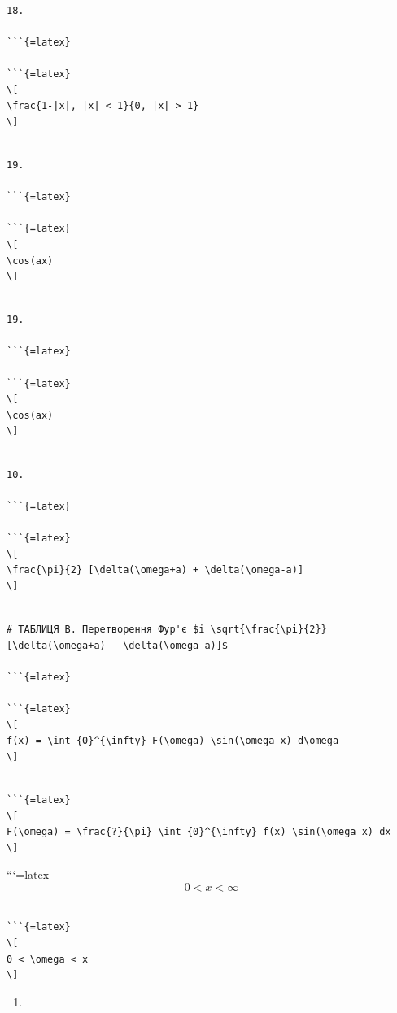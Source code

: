 \documentclass[
]{article}
\providecommand{\tightlist}{%
  \setlength{\itemsep}{0pt}\setlength{\parskip}{0pt}}
\begin{document}
\begin{verbatim}

18.

```{=latex}

```{=latex}
\[
\frac{1-|x|, |x| < 1}{0, |x| > 1}
\]
\end{verbatim}

\begin{verbatim}

19.

```{=latex}

```{=latex}
\[
\cos(ax)
\]
\end{verbatim}

\begin{verbatim}

19.

```{=latex}

```{=latex}
\[
\cos(ax)
\]
\end{verbatim}

\begin{verbatim}

10.

```{=latex}

```{=latex}
\[
\frac{\pi}{2} [\delta(\omega+a) + \delta(\omega-a)]
\]
\end{verbatim}

\begin{verbatim}

# ТАБЛИЦЯ B. Перетворення Фур'є $i \sqrt{\frac{\pi}{2}} [\delta(\omega+a) - \delta(\omega-a)]$ 

```{=latex}

```{=latex}
\[
f(x) = \int_{0}^{\infty} F(\omega) \sin(\omega x) d\omega
\]
\end{verbatim}

\begin{verbatim}

```{=latex}
\[
F(\omega) = \frac{?}{\pi} \int_{0}^{\infty} f(x) \sin(\omega x) dx
\]
\end{verbatim}

```{=latex}
\[
0 < x < \infty
\]

\begin{verbatim}

```{=latex}
\[
0 < \omega < x
\]
\end{verbatim}

\begin{enumerate}
\def\labelenumi{\arabic{enumi}.}
\tightlist
\item
\end{enumerate}
\end{document}

